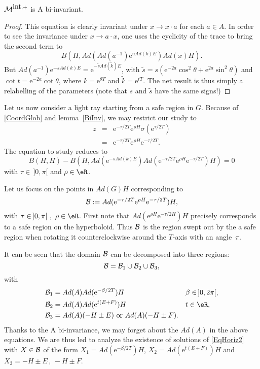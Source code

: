 \begin{lemma}
${\cal M}^{\mbox{int},+}$ is A bi-invariant.
\label{BiInv}
\end{lemma}
 \begin{proof}
 This equation is clearly invariant under $x \to x\cdot a$ for each $a\in A$. In order to see the invariance under $x \to a\cdot x$, one uses the cyclicity of the trace to bring the second term to
\[
 B(H,Ad(Ad(a^{-1})\mbox{e}^{u Ad(k)E}) Ad(x) H).
\]
But $Ad(a^{-1})\mbox{e}^{-s Ad(k)E} = \mbox{e}^{-\tilde{s} Ad(\tilde{k})E}$, with $\tilde{s} = s (\mbox{e}^{-2a} \cos^2\theta + \mbox{e}^{2a} \sin^2 \theta)$ and $\cot t = \mbox{e}^{-2a} \cot \theta$, where $k = \mbox{e}^{\theta T}$ and $\tilde{k}=\mbox{e}^{t T}$. The net result is thus simply a relabelling of the parameters (note that $s$ and $\tilde{s}$ have the same signs!)
\end{proof}

Let us now consider a light ray starting from a safe region in $G$. Because of \eqref{CoordGlob} and lemma~\ref{BiInv}, we may restrict our study to
\begin{eqnarray}
 z &=& \mbox{e}^{-\tau/2 T} \mbox{e}^{\rho H} \sigma(\mbox{e}^{\tau/2 T}) \\
 &=& \mbox{e}^{-\tau/2 T} \mbox{e}^{\rho H} \mbox{e}^{-\tau/2 T}.
 \end{eqnarray}
The equation to study reduces to
\begin{equation}\label{EqHoriz2}
B(H,H) - B(H,Ad(\mbox{e}^{-s Ad(k)E}) Ad(\mbox{e}^{-\tau/2 T}
\mbox{e}^{\rho H} \mbox{e}^{-\tau/2 T}) H) = 0
\end{equation}
with $\tau\in \, ]0,\pi[$ and  $\rho \in \eR$.

Let us focus on the points in $Ad(G)H$ corresponding to
\[
{\cal B}:= Ad(\mbox{e}^{-\tau/2 T} \mbox{e}^{\rho H} \mbox{e}^{-\tau/2 T})H,
\]
with $\tau \in \, ]0,\pi[ \,\, , \,\, \rho \in \eR$. First note that $Ad(\mbox{e}^{\rho H} \mbox{e}^{-\tau/2 H}) H$ precisely corresponds to a safe region on the hyperboloid. Thus ${\cal B}$ is the region swept out by the a safe region when rotating it counterclockwise around the $T$-axis with an angle~$\pi$.

It can be seen that the domain ${\cal B}$ can be decomposed into three regions:
\begin{equation}
 {\cal B} = {\cal B}_1 \cup {\cal B}_2 \cup {\cal B}_3,
 \end{equation}
with
\begin{subequations}
\begin{align}
{\cal B}_1 &=Ad(A)Ad(\mbox{e}^{-\beta/2 T})H &&   \beta \in \, ]0,2\pi[,\\
{\cal B}_2 &=Ad(A)Ad(\mbox{e}^{t (E+F)})H    &&    t\in \eR, \\
{\cal B}_3 &=Ad(A)(-H \pm E) \textrm{ or } Ad(A)(-H \pm F).
\end{align}
\end{subequations}
Thanks to the A bi-invariance, we may forget about the $Ad(A)$ in the above equations. We are thus led to analyze the existence of solutions of \eqref{EqHoriz2} with $X \in {\cal B}$ of the form $X_1 = Ad(\mbox{e}^{-\beta/2 T})H$, $X_2 =Ad(\mbox{e}^{t (E+F)})H$ and $X_3 =-H \pm E \, , \, -H \pm F$.

